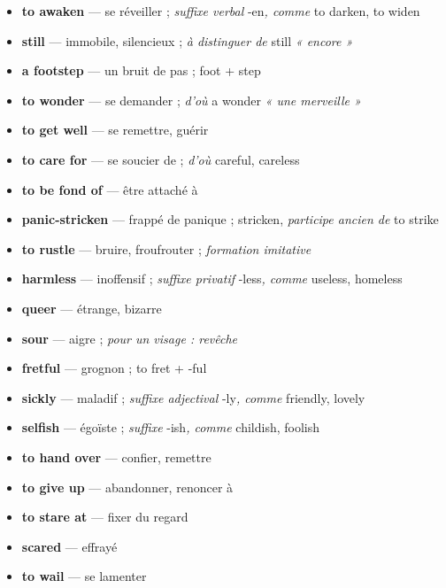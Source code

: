 \documentclass{fiche}
\begin{document}


\begin{itemize}[label=--,itemsep=0.8mm,leftmargin=*]\small
  \item \textbf{to awaken} — se réveiller ; \textit{suffixe verbal} -en\textit{, comme} to darken, to widen
  \item \textbf{still} — immobile, silencieux ; \textit{à distinguer de} still \textit{« encore »}
  \item \textbf{a footstep} — un bruit de pas ; foot + step
  \item \textbf{to wonder} — se demander ; \textit{d'où} a wonder \textit{« une merveille »}
  \item \textbf{to get well} — se remettre, guérir
  \item \textbf{to care for} — se soucier de ; \textit{d'où} careful, careless
  \item \textbf{to be fond of} — être attaché à
  \item \textbf{panic-stricken} — frappé de panique ; stricken, \textit{participe ancien de} to strike
  \item \textbf{to rustle} — bruire, froufrouter ; \textit{formation imitative}
  \item \textbf{harmless} — inoffensif ; \textit{suffixe privatif} -less\textit{, comme} useless, homeless
  \item \textbf{queer} — étrange, bizarre
  \item \textbf{sour} — aigre ; \textit{pour un visage : revêche}
  \item \textbf{fretful} — grognon ; to fret + -ful
  \item \textbf{sickly} — maladif ; \textit{suffixe adjectival} -ly\textit{, comme} friendly, lovely
  \item \textbf{selfish} — égoïste ; \textit{suffixe} -ish\textit{, comme} childish, foolish
  \item \textbf{to hand over} — confier, remettre
  \item \textbf{to give up} — abandonner, renoncer à
  \item \textbf{to stare at} — fixer du regard
  \item \textbf{scared} — effrayé
  \item \textbf{to wail} — se lamenter
\end{itemize}
\end{document}
